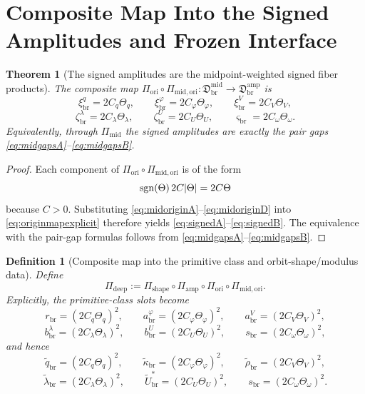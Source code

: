 \documentclass[11pt]{article}
\newcommand{\RespShapeReadout}{\widetilde q_{\mathrm{br}}}
\newcommand{\RespShapeCov}{\widetilde\kappa_{\mathrm{br}}}
\newcommand{\RespShapeRelax}{\widetilde\rho_{\mathrm{br}}}
\newcommand{\RespShapeWell}{\widetilde\lambda_{\mathrm{br}}}
\newcommand{\RespShapeEq}{\widetilde U_{\mathrm{br}}^{\ast}}
\newcommand{\ScaleMod}{s_{\mathrm{br}}}
\newcommand{\PrimRead}{r_{\mathrm{br}}}
\newcommand{\PrimCovSlot}{a_{\mathrm{br}}^{\varphi}}
\newcommand{\PrimRelaxSlot}{a_{\mathrm{br}}^{V}}
\newcommand{\PrimWellSlot}{b_{\mathrm{br}}^{\lambda}}
\newcommand{\PrimEqSlot}{b_{\mathrm{br}}^{U}}
\newcommand{\LiftSector}{\mathfrak D_{\mathrm{br}}^{\mathrm{amp}}}
\newcommand{\DeepReadAmp}{\xi_{\mathrm{br}}^{q}}
\newcommand{\DeepCovAmp}{\xi_{\mathrm{br}}^{\varphi}}
\newcommand{\DeepRelaxAmp}{\xi_{\mathrm{br}}^{V}}
\newcommand{\DeepWellAmp}{\zeta_{\mathrm{br}}^{\lambda}}
\newcommand{\DeepEqAmp}{\zeta_{\mathrm{br}}^{U}}
\newcommand{\DeepScaleAmp}{\varsigma_{\mathrm{br}}}
\newcommand{\AmpMap}{\Pi_{\mathrm{amp}}}
\newcommand{\PrimMap}{\Pi_{\mathrm{shape}}}
\newcommand{\OriginMap}{\Pi_{\mathrm{ori}}}
\newcommand{\DeepMap}{\Pi_{\mathrm{deep}}}
\newcommand{\MidFiberSector}{\mathfrak D_{\mathrm{br}}^{\mathrm{mid}}}
\newcommand{\MidPairMap}{\Pi_{\mathrm{mid}}}
\newcommand{\MidOriginMap}{\Pi_{\mathrm{mid,ori}}}
\newcommand{\MidRead}{C_{q}}
\newcommand{\MidCov}{C_{\varphi}}
\newcommand{\MidRelax}{C_{V}}
\newcommand{\MidWell}{C_{\lambda}}
\newcommand{\MidEq}{C_{U}}
\newcommand{\MidScale}{C_{\omega}}
\newcommand{\FiberRead}{\Theta_{q}}
\newcommand{\FiberCov}{\Theta_{\varphi}}
\newcommand{\FiberRelax}{\Theta_{V}}
\newcommand{\FiberWell}{\Theta_{\lambda}}
\newcommand{\FiberEq}{\Theta_{U}}
\newcommand{\FiberScale}{\Theta_{\omega}}
\newtheorem{definition}{Definition}
\newtheorem{theorem}{Theorem}
\begin{document}
\section{Composite Map Into the Signed Amplitudes and Frozen Interface}

\begin{theorem}[The signed amplitudes are the midpoint-weighted signed fiber products]
\label{thm:signed}
The composite map \(\OriginMap\circ\MidOriginMap:\MidFiberSector\to\LiftSector\) is
\begin{equation}
\DeepReadAmp=2\MidRead\FiberRead,
\qquad
\DeepCovAmp=2\MidCov\FiberCov,
\qquad
\DeepRelaxAmp=2\MidRelax\FiberRelax,
\label{eq:signedA}
\end{equation}
\begin{equation}
\DeepWellAmp=2\MidWell\FiberWell,
\qquad
\DeepEqAmp=2\MidEq\FiberEq,
\qquad
\DeepScaleAmp=2\MidScale\FiberScale.
\label{eq:signedB}
\end{equation}
Equivalently, through \(\MidPairMap\) the signed amplitudes are exactly the pair gaps \eqref{eq:midgapsA}--\eqref{eq:midgapsB}.
\end{theorem}

\begin{proof}
Each component of \(\OriginMap\circ\MidOriginMap\) is of the form
\[
\operatorname{sgn}(\Theta)\,2C\abs{\Theta}=2C\Theta
\]
because \(C>0\). Substituting \eqref{eq:midoriginA}--\eqref{eq:midoriginD} into \eqref{eq:originmapexplicit} therefore yields \eqref{eq:signedA}--\eqref{eq:signedB}. The equivalence with the pair-gap formulas follows from \eqref{eq:midgapsA}--\eqref{eq:midgapsB}.
\end{proof}

\begin{definition}[Composite map into the primitive class and orbit-shape/modulus data]
\label{def:deepmap}
Define
\begin{equation}
\DeepMap
:=
\PrimMap\circ\AmpMap\circ\OriginMap\circ\MidOriginMap.
\label{eq:deepmap}
\end{equation}
Explicitly, the primitive-class slots become
\begin{equation}
\PrimRead=(2\MidRead\FiberRead)^{2},
\qquad
\PrimCovSlot=(2\MidCov\FiberCov)^{2},
\qquad
\PrimRelaxSlot=(2\MidRelax\FiberRelax)^{2},
\label{eq:primmidA}
\end{equation}
\begin{equation}
\PrimWellSlot=(2\MidWell\FiberWell)^{2},
\qquad
\PrimEqSlot=(2\MidEq\FiberEq)^{2},
\qquad
\ScaleMod=(2\MidScale\FiberScale)^{2},
\label{eq:primmidB}
\end{equation}
and hence
\begin{equation}
\RespShapeReadout=(2\MidRead\FiberRead)^{2},
\qquad
\RespShapeCov=(2\MidCov\FiberCov)^{2},
\qquad
\RespShapeRelax=(2\MidRelax\FiberRelax)^{2},
\label{eq:shapemidA}
\end{equation}
\begin{equation}
\RespShapeWell=(2\MidWell\FiberWell)^{2},
\qquad
\RespShapeEq=(2\MidEq\FiberEq)^{2},
\qquad
\ScaleMod=(2\MidScale\FiberScale)^{2}.
\label{eq:shapemidB}
\end{equation}
\end{definition}
\end{document}
